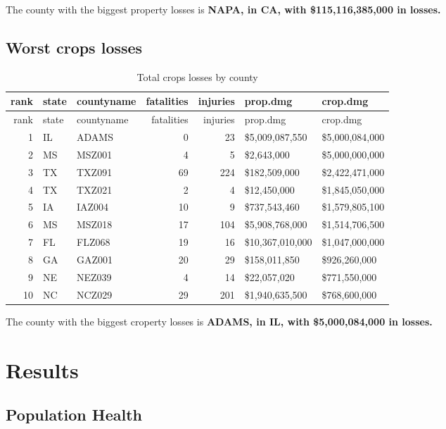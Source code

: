 The county with the biggest property losses is \textbf{NAPA, in CA, with
\$115,116,385,000 in losses.}

\subsection{Worst crops losses}\label{worst-crops-losses}

\begin{longtable}[]{@{}rllrrll@{}}
\caption{Total crops losses by county}\tabularnewline
\toprule
rank & state & countyname & fatalities & injuries & prop.dmg &
crop.dmg\tabularnewline
\midrule
\endfirsthead
\toprule
rank & state & countyname & fatalities & injuries & prop.dmg &
crop.dmg\tabularnewline
\midrule
\endhead
1 & IL & ADAMS & 0 & 23 & \$5,009,087,550 &
\$5,000,084,000\tabularnewline
2 & MS & MSZ001 & 4 & 5 & \$2,643,000 & \$5,000,000,000\tabularnewline
3 & TX & TXZ091 & 69 & 224 & \$182,509,000 &
\$2,422,471,000\tabularnewline
4 & TX & TXZ021 & 2 & 4 & \$12,450,000 & \$1,845,050,000\tabularnewline
5 & IA & IAZ004 & 10 & 9 & \$737,543,460 &
\$1,579,805,100\tabularnewline
6 & MS & MSZ018 & 17 & 104 & \$5,908,768,000 &
\$1,514,706,500\tabularnewline
7 & FL & FLZ068 & 19 & 16 & \$10,367,010,000 &
\$1,047,000,000\tabularnewline
8 & GA & GAZ001 & 20 & 29 & \$158,011,850 & \$926,260,000\tabularnewline
9 & NE & NEZ039 & 4 & 14 & \$22,057,020 & \$771,550,000\tabularnewline
10 & NC & NCZ029 & 29 & 201 & \$1,940,635,500 &
\$768,600,000\tabularnewline
\bottomrule
\end{longtable}

The county with the biggest croperty losses is \textbf{ADAMS, in IL,
with \$5,000,084,000 in losses.}

\section{Results}\label{results}

\subsection{Population Health}\label{population-health}

